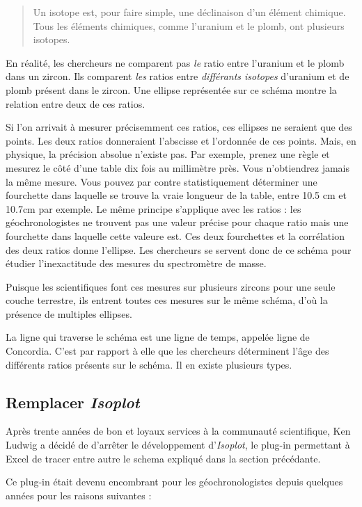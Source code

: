 \begin{quote}
Un isotope est, pour faire simple, une déclinaison d'un élément chimique. Tous les éléments chimiques, comme l'uranium et le plomb, ont plusieurs isotopes.
\end{quote}

En réalité, les chercheurs ne comparent pas \emph{le} ratio entre l'uranium et le plomb dans un zircon. Ils comparent \emph{les} ratios entre \emph{différants isotopes} d'uranium et de plomb présent dans le zircon.
Une ellipse représentée sur ce schéma montre la relation entre deux de ces ratios.

Si l'on arrivait à mesurer précisemment ces ratios, ces ellipses ne seraient que des points. Les deux ratios donneraient l'abscisse et l'ordonnée de ces points. Mais, en physique, la précision absolue n'existe pas. Par exemple, prenez une règle et mesurez le côté d'une table dix fois au millimètre près. Vous n'obtiendrez jamais la même mesure. Vous pouvez par contre statistiquement déterminer une fourchette dans laquelle se trouve la vraie longueur de la table, entre 10.5 cm et 10.7cm par exemple. Le même principe s'applique avec les ratios : les géochronologistes ne trouvent pas une valeur précise pour chaque ratio mais une fourchette dans laquelle cette valeure est. Ces deux fourchettes et la corrélation des deux ratios donne l'ellipse. Les chercheurs se servent donc de ce schéma pour étudier l'inexactitude des mesures du spectromètre de masse.

Puisque les scientifiques font ces mesures sur plusieurs zircons pour une seule couche terrestre, ils entrent toutes ces mesures sur le même schéma, d'où la présence de multiples ellipses.

La ligne qui traverse le schéma est une ligne de temps, appelée ligne de Concordia. C'est par rapport à elle que les chercheurs déterminent l'âge des différents ratios présents sur le schéma. Il en existe plusieurs types.

\subsection{Remplacer \textit{Isoplot}}
Après trente années de bon et loyaux services à la communauté scientifique, Ken Ludwig a décidé de d'arrêter le développement d'\textit{Isoplot}, le plug-in permettant à Excel de tracer entre autre le schema expliqué dans la section précédante.

Ce plug-in était devenu encombrant pour les géochronologistes depuis quelques années pour les raisons suivantes :

